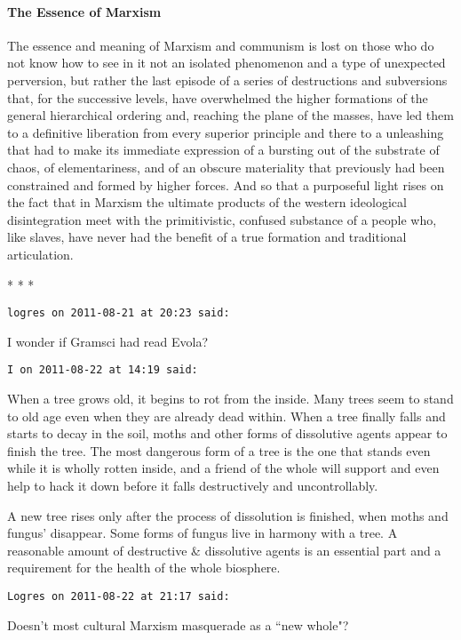 \paragraph{The Essence of Marxism}
\begin{quotex}
The essence and meaning of Marxism and communism is lost on those who do not know how to see in it not an isolated phenomenon and a type of unexpected perversion, but rather the last episode of a series of destructions and subversions that, for the successive levels, have overwhelmed the higher formations of the general hierarchical ordering and, reaching the plane of the masses, have led them to a definitive liberation from every superior principle and there to a unleashing that had to make its immediate expression of a bursting out of the substrate of chaos, of elementariness, and of an obscure materiality that previously had been constrained and formed by higher forces. And so that a purposeful light rises on the fact that in Marxism the ultimate products of the western ideological disintegration meet with the primitivistic, confused substance of a people who, like slaves, have never had the benefit of a true formation and traditional articulation. 

\end{quotex}



\begin{center}* * *\end{center}

\begin{footnotesize}\begin{sffamily}



\texttt{logres on 2011-08-21 at 20:23 said: }

I wonder if Gramsci had read Evola?


\hfill

\texttt{I on 2011-08-22 at 14:19 said: }

When a tree grows old, it begins to rot from the inside. Many trees seem to stand to old age even when they are already dead within. When a tree finally falls and starts to decay in the soil, moths and other forms of dissolutive agents appear to finish the tree. The most dangerous form of a tree is the one that stands even while it is wholly rotten inside, and a friend of the whole will support and even help to hack it down before it falls destructively and uncontrollably.

A new tree rises only after the process of dissolution is finished, when moths and fungus' disappear. Some forms of fungus live in harmony with a tree. A reasonable amount of destructive \& dissolutive agents is an essential part and a requirement for the health of the whole biosphere.


\hfill

\texttt{Logres on 2011-08-22 at 21:17 said: }

Doesn't most cultural Marxism masquerade as a ``new whole"?


\end{sffamily}\end{footnotesize}
